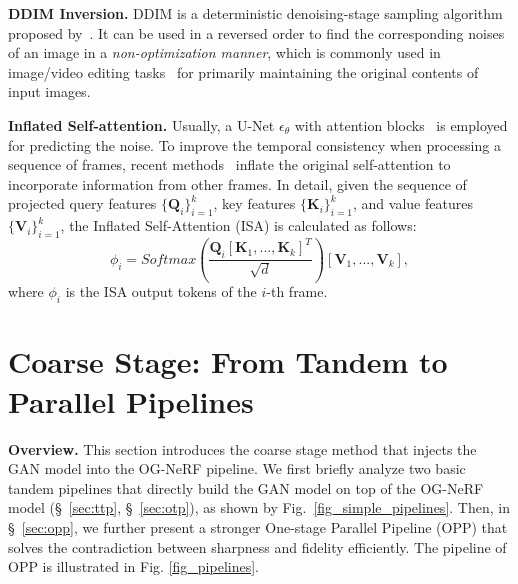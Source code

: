 \vspace{0.1cm}
\noindent\textbf{DDIM Inversion.} DDIM is a deterministic denoising-stage sampling algorithm proposed by~\cite{song2020DDIM}. It can be used in a reversed order to find the corresponding noises of an image in a \textit{non-optimization manner}, which is commonly used in image/video editing tasks~\cite{yang2023rerender,geyer2023tokenflow,Tumanyan_2023_CVPR_PnP} for primarily maintaining the original contents of input images.

\vspace{0.1cm}
\noindent\textbf{Inflated Self-attention.} Usually, a U-Net $\epsilon_{\theta}$ with attention blocks~\cite{rombach2022LatentDiff,zhang2023addingControlNet} is employed for predicting the noise. To improve the temporal consistency when processing a sequence of frames, recent methods~\cite{wu2023tune-a-video,yang2023rerender,geyer2023tokenflow} inflate the original self-attention to incorporate information from other frames. In detail, given the sequence of projected query features $\{\textbf{Q}_i\}_{i=1}^{k}$, key features $\{\textbf{K}_i\}_{i=1}^{k}$, and value features $\{\textbf{V}_i\}_{i=1}^{k}$, the Inflated Self-Attention (ISA) is calculated as follows: 
\begin{equation}
    \phi_{i} = Softmax(\frac{\textbf{Q}_i[\textbf{K}_1, ...,\textbf{K}_k]^T}{\sqrt{d}}) [\textbf{V}_1, ..., \textbf{V}_k],
\end{equation}
where $\phi_{i}$ is the ISA output tokens of the $i$-th frame.

\section{\textbf{Coarse Stage: From Tandem to Parallel Pipelines}}
\label{sec:coarse_stage_opp}








\noindent\textbf{Overview.} This section introduces the coarse stage method that injects the GAN model into the OG-NeRF pipeline. We first briefly analyze two basic tandem pipelines that directly build the GAN model on top of the OG-NeRF model (\S~\ref{sec:ttp}, \S~\ref{sec:otp}), as shown by Fig.~\ref{fig_simple_pipelines}. Then, in \S~\ref{sec:opp}, we further present a stronger One-stage Parallel Pipeline (OPP)  that solves the contradiction between sharpness and fidelity efficiently. The pipeline of OPP is illustrated in Fig. \ref{fig_pipelines}.



